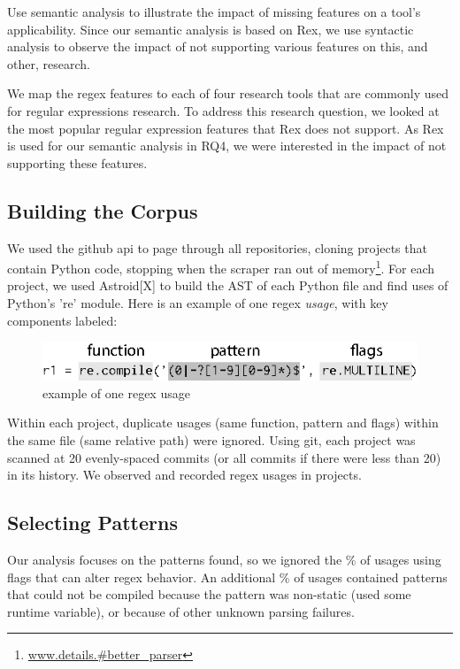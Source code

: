 Use semantic analysis to illustrate the impact of missing features on a tool's applicability. Since our semantic analysis is based on Rex, we use syntactic analysis to observe the impact of not supporting various features on this, and other, research. 


We map the regex features to each of four research tools that are commonly used for regular expressions research. 
To address this research question, we looked at the most popular regular expression features that Rex does not support. As Rex is used for our semantic analysis in RQ4, we were interested in the impact of not supporting these features. 




\subsection{Building the Corpus}
\label{study:corpus}
We used the github api to page through all repositories, cloning projects that contain Python code, stopping when the scraper ran out of memory\footnote{\url{www.details.#better_parser}}.  For each project, we used Astroid[X] to build the AST of each Python file and find uses of Python's 're' module.  Here is an example of one regex \emph{usage}, with key components labeled:

\begin{figure}[htb]
\centering
\includegraphics[width=\columnwidth]{../illustrations/exampleUsage.eps}
\caption{example of one regex usage}
\label{fig:exampleUsage}
\end{figure}

Within each project, duplicate usages (same function, pattern and flags) within the same file (same relative path) were ignored.  Using git, each project was scanned at 20 evenly-spaced commits (or all commits if there were less than 20) in its history.  We observed and recorded  regex usages in  projects.

\subsection{Selecting Patterns}
Our analysis focuses on the patterns found, so we ignored the \%  of usages using flags that can alter regex behavior.  An additional \% of usages contained patterns that could not be compiled because the pattern was non-static (used some runtime variable), or because of other unknown parsing failures.

